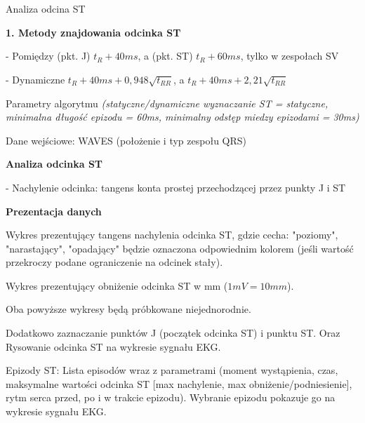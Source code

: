 \documentclass[11pt,a4paper]{report}
\begin{document}
\begin{center}
  Analiza odcina ST
\end{center}

\textbf{1. Metody znajdowania odcinka ST}

 - Pomiędzy (pkt. J) $t_R+40ms$, a (pkt. ST) $t_R+60ms$, tylko w zespołach SV

 - Dynamiczne $t_R+40ms+0,948\sqrt{t_{RR}}$, a $t_R+40ms+2,21\sqrt{t_{RR}}$

 Parametry algorytmu \emph{(statyczne/dynamiczne wyznaczanie ST = statyczne, minimalna
 długość epizodu = 60ms, minimalny odstęp miedzy epizodami = 30ms)}

 Dane wejściowe: WAVES (położenie i typ zespołu QRS)

\textbf{Analiza odcinka ST}

  - Nachylenie odcinka: tangens konta prostej przechodzącej przez punkty J i
  ST

\textbf{Prezentacja danych}

  Wykres prezentujący tangens nachylenia odcinka ST, gdzie cecha: "poziomy",
  "narastający", "opadający" będzie oznaczona odpowiednim kolorem (jeśli
  wartość przekroczy podane ograniczenie na odcinek stały).

  Wykres prezentujący obniżenie odcinka ST w mm ($1mV = 10mm$).

  Oba powyższe wykresy będą próbkowane niejednorodnie.

  Dodatkowo zaznaczanie punktów J (początek odcinka ST) i punktu ST. Oraz
  Rysowanie odcinka ST na wykresie sygnału EKG.

  Epizody ST: Lista episodów wraz z parametrami (moment wystąpienia, czas,
  maksymalne wartości odcinka ST [max nachylenie, max obniżenie/podniesienie],
  rytm serca przed, po i w trakcie epizodu). Wybranie epizodu pokazuje go na
  wykresie sygnału EKG.
\end{document}
